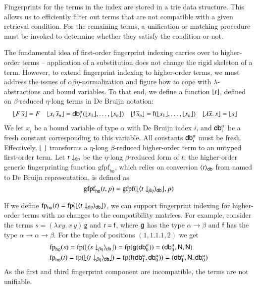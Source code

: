 Fingerprints for the terms in the index are stored in a trie data structure.
This allows us to efficiently filter out terms that are not compatible with a given
retrieval condition. For the remaining terms, a unification or matching
procedure must be invoked to determine whether they satisfy the condition or not.

The fundamental idea of first-order fingerprint indexing carries over to
higher-order terms -- 
application of a substitution does not change the rigid skeleton of a term.
However, to extend fingerprint indexing to
higher-order terms, we must address the issues of $\alpha\beta\eta$-normalization and figure how to cope with $\lambda$-abstractions and
bound variables. To that end, we define a function $\lfloor t\rfloor$, defined on
$\beta$-reduced $\eta$-long terms in De Bruijn \cite{db-75-dbindices} notation:
\begin{align*}
& \lfloor F \, \overline{s}\rfloor = F
&& \lfloor x_i \, \overline{s}_n \rfloor = \textsf{db}_{i}^{\alpha}(\lfloor s_1\rfloor, \ldots, \lfloor s_n\rfloor)
&& \lfloor\mathsf{f} \, \overline{s}_n \rfloor = \mathsf{f}(\lfloor s_1\rfloor, \ldots, \lfloor s_n\rfloor) &&
\lfloor\lambda \overline{x}. \, s  \rfloor = \lfloor s\rfloor
\end{align*}
We let $x_i$ be a bound variable of type $\alpha$ with De Bruijn index $i$,
and $\textsf{db}_{i}^{\alpha}$ be a fresh constant corresponding to this variable. All constants
$\textsf{db}_{i}^{\alpha}$ must be fresh. 
Effectively, $\lfloor\;\rfloor$ transforms a $\eta$-long $\beta$-reduced higher-order term to an untyped first-order term. Let $\nf{t}{\beta\eta}$ be
the $\eta$-long $\beta$-reduced form of $t$; the higher-order generic
fingerprinting function $\text{gfpf}_\textsf{ho}$, which relies on conversion $\langle t \rangle_\textsf{db}$ from
named to De Bruijn representation, is defined as
\[
  \text{gfpf}_\textsf{ho}(t,p) =
    \text{gfpf}(\hotofo{\nametodb{\nf{t}{\beta\eta}}}, p)
\]

If we define $\text{fp}_\textsf{ho}(t) =
\text{fp}(\hotofo{\nametodb{\nf{t}{\beta\eta}}})$, we can support fingerprint indexing
for higher-order terms with no changes to the compatibility matrices. For example,
consider the terms $s = (\lambda x y. \, x \, y) \, \textsf{g}$ and $t = \mathsf{f}$,
where $\mathsf{g}$ has the type $\alpha \rightarrow \beta$ and $\mathsf{f}$ has the
type $\alpha \rightarrow \alpha \rightarrow \beta$. 
For the tuple of
positions $(1, 1.1.1, 2)$ we get
\begin{align*}
  & \text{fp}_\textsf{ho}(s) =
    \text{fp}(\hotofo{\nametodb{\nf{s}{\beta\eta}}}) =
    \text{fp}(\cst{g}(\cstdba{0})) = 
    (\cstdba{0}, \NN, \NN) \\
  & \text{fp}_\textsf{ho}(t) =
   \text{fp}(\hotofo{\nametodb{\nf{t}{\beta\eta}}}) =
    \text{fp}(\cst{f}(\cstdba{1}, \cstdba{0})) = 
    (\cstdba{1}, \NN, \cstdba{0})
\end{align*}
As the first and third fingerprint component are incompatible, the terms are not unifiable.

